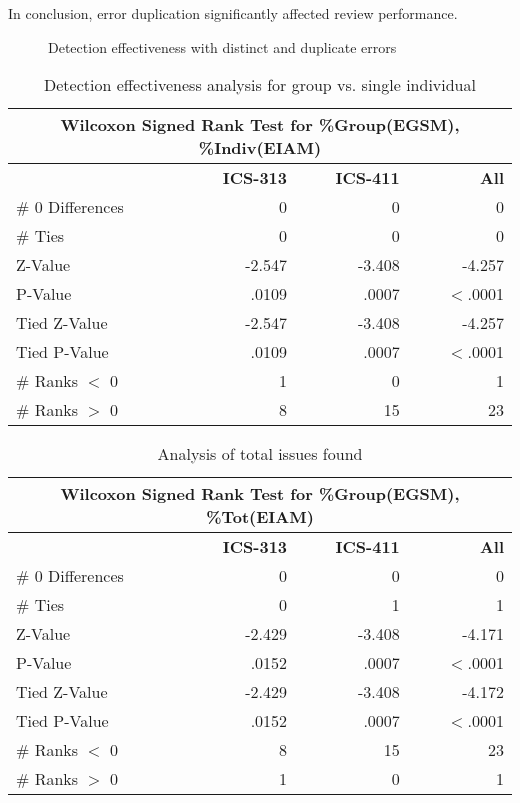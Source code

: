 In conclusion, error duplication significantly affected review
performance. 


\begin{figure}[htb]
 {\centerline{}}
 \caption{Detection effectiveness with distinct and duplicate errors}
 \label{duplicate}
\end{figure}

\begin{table}[htb]
 \caption{Detection effectiveness analysis for group vs. single individual} 
 \begin{center}
 \begin{tabular}{|l|r|r|r|}
  \hline
  \multicolumn{4}{|c|}{\bf Wilcoxon Signed Rank Test for \%Group(EGSM), \%Indiv(EIAM)}\\
  \hline
  & {\bf ICS-313} & {\bf ICS-411} & {\bf All} \\ 
  \hline
  \# 0 Differences & 0      & 0 & 0\\
  \# Ties          & 0      & 0 & 0\\
  Z-Value          & -2.547 & -3.408 & -4.257\\
  P-Value          & .0109  & .0007 & $<$.0001\\
  Tied Z-Value     & -2.547 & -3.408 & -4.257\\
  Tied P-Value     & .0109  & .0007 & $<$.0001\\
  \# Ranks $<$ 0   & 1      & 0 & 1\\
  \# Ranks $>$ 0   & 8      & 15 & 23\\
  \hline
     \end{tabular}
  \end{center}
  \label{max-duplication-analysis}
\end{table} 

\begin{table}[htb]
 \caption{Analysis of total issues found}
 \begin{center}
 \begin{tabular}{|l|r|r|r|}
  \hline
  \multicolumn{4}{|c|}{\bf Wilcoxon Signed Rank Test for \%Group(EGSM), \%Tot(EIAM)}\\
  \hline
  & {\bf ICS-313} & {\bf ICS-411} & {\bf All} \\ 
  \hline
  \# 0 Differences & 0      & 0 & 0\\
  \# Ties          & 0      & 1 & 1\\
  Z-Value          & -2.429 & -3.408 & -4.171\\
  P-Value          & .0152  & .0007 & $<$.0001\\
  Tied Z-Value     & -2.429 & -3.408 & -4.172\\
  Tied P-Value     & .0152  & .0007 & $<$.0001\\
  \# Ranks $<$ 0   & 8      & 15 & 23\\
  \# Ranks $>$ 0   & 1      & 0 & 1\\
  \hline
     \end{tabular}
  \end{center}
  \label{min-duplication-analysis}
\end{table} 


